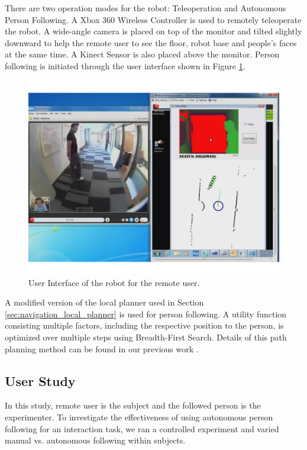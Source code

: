 There are two operation modes for the robot: Teleoperation and Autonomous Person Following. A Xbox 360 Wireless Controller is used to remotely teleoperate the robot.  A wide-angle camera is placed on top of the monitor and tilted slightly downward to help the remote user to see the floor, robot base and people's faces at the same time. A Kinect Sensor is also placed above the monitor. Person following is initiated through the user interface shown in Figure \ref{fig:telepresence_ui}.

\begin{figure}[h!]
\centering
\includegraphics[width=1.0\textwidth]{pics/telepresence_ui_cropped}
\caption{User Interface of the robot for the remote user.}
\label{fig:telepresence_ui}
\end{figure}

A modified version of the local planner used in Section \ref{sec:navigation_local_planner} is used for person following. A utility function consisting multiple factors, including the respective position to the person, is optimized over multiple steps using Breadth-First Search. Details of this path planning method can be found in our previous work \cite{cosgun2013autonomous}.

\subsection{User Study}

In this study, remote user is the subject and the followed person is the experimenter. To investigate the effectiveness of using autonomous person following for an interaction task, we ran a controlled experiment and varied manual vs. autonomous following within subjects.

